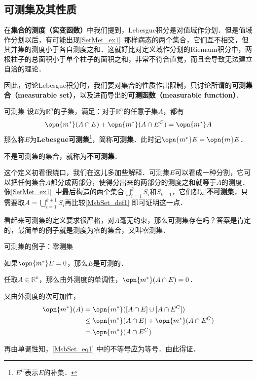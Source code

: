 

\subsection{可测集及其性质}

在\textbf{集合的测度（实变函数）}中我们提到，Lebesgue积分是对值域作分划．但是值域作分划以后，有可能出现\autoref{SetMet_ex1}~那样病态的两个集合，它们互不相交，但其并集的测度小于各自测度之和．这就好比对定义域作分划的Riemann积分中，两根柱子的总面积小于单个柱子的面积之和，非常不符合直觉，而且会导致无法建立自洽的理论．

因此，讨论Lebesgue积分时，我们要对集合的性质作出限制，只讨论所谓的\textbf{可测集合（measurable set）}，以及进而导出的\textbf{可测函数（measurable function）}．

\begin{definition}{可测集}\label{MsbSet_def1}
设$E$为$\mathbb{R}^n$的子集，满足：对于$\mathbb{R}^n$的任意子集$A$，都有
\begin{equation}
\opn{m^*}(A\cap E)+\opn{m^*}(A\cap E^C)=\opn{m^*}A
\end{equation}
那么称$E$为\textbf{Lebesgue可测集}\footnote{$E^C$表示$E$的补集．}，简称\textbf{可测集}．此时记$\opn{m^*}E=\opn{m}E$．

不是可测集的集合，就称为\textbf{不可测集}．

\end{definition}

这个定义初看很绕口，我们在这儿多加些解释．可测集$E$可以看成一种分割，它可以把任何集合$A$都分成两部分，使得分出来的两部分的测度之和就等于$A$的测度．像\autoref{SetMet_ex1}~中最后构造的两个集合$\bigcup_{i=1}^k S_i$和$S_{k+1}$，它们都是\textbf{不可测集}，只需要取$A=\bigcup^{k+1}_{i=1} S_i$再比较\autoref{MsbSet_def1} 即可证明这一点．

看起来可测集的定义要求很严格，对$A$毫无约束，那么可测集存在吗？答案是肯定的，最简单的例子就是测度为零的集合，又叫零测集．

\begin{example}{可测集的例子：零测集}

如果$\opn{m^*}E=0$，那么$E$是可测的．

任取$A\in\mathbb{R}^n$，那么由外测度的单调性，$\opn{m^*}(A\cap E)=0$．

又由外测度的次可加性，
\begin{equation}\label{MsbSet_eq1}
\begin{aligned}
\opn{m^*}(A)&=\opn{m^*}([A\cap E]\cup[A\cap E^C])\\
&\leq \opn{m^*}(A\cap E)+\opn{m^*}(A\cap E^C)\\
&=\opn{m^*}(A\cap E^C)
\end{aligned}
\end{equation}

再由单调性知，\autoref{MsbSet_eq1} 中的不等号应为等号．由此得证．

\end{example}

